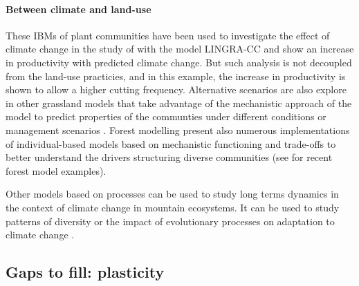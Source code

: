 \paragraph{Between climate and land-use}
These IBMs of plant communities have been used to investigate the effect of climate change in the study of \citet{rodriguez_lingra-cc:_1999} with the model LINGRA-CC and show an increase in productivity with predicted climate change. But such analysis is not decoupled from the land-use practicies, and in this example, the increase in productivity is shown to allow a higher cutting frequency. Alternative scenarios are also explore in other grassland models that take advantage of the mechanistic approach of the model to predict properties of the communties under different conditions or management scenarios \parencite{taubert_review_2012, taubert_modelling_2014, maire_plasticity_2013, maire_trade-off_2009}. Forest modelling present also numerous implementations of individual-based models based on mechanistic functioning and trade-offs to better understand the drivers structuring diverse communities (see \citet{falster_plant:_2016, marechaux_individual-based_2017} for recent forest model examples).

Other models based on processes can be used to study long terms dynamics in the context of climate change in mountain ecosystems. It can be used to study patterns of diversity \parencite{isabelle_fate-hd:_2014} or the impact of evolutionary processes on adaptation to climate change \parencite{cotto_dynamic_2017}.






\subsection{Gaps to fill: plasticity}

